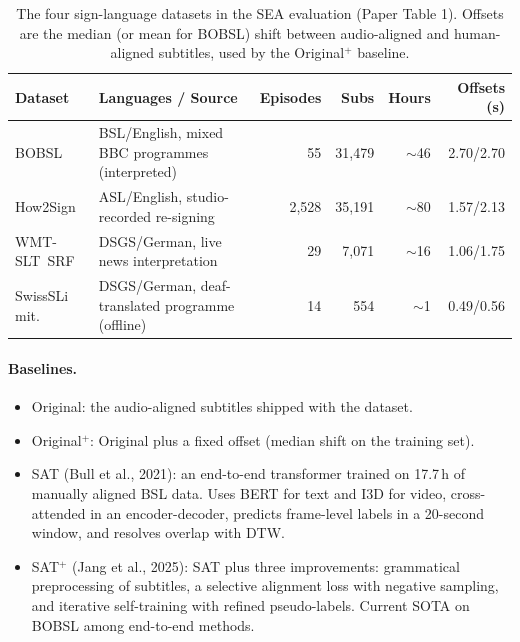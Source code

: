 \documentclass[11pt,a4paper]{article}
\def\textbf#1{#1}%
\def\emph#1{#1}%
\begin{document}
\begin{table}[h]
\centering
\small
\begin{tabularx}{\linewidth}{lXrrrr}
\toprule
\textbf{Dataset} & \textbf{Languages / Source} & \textbf{Episodes} & \textbf{Subs} & \textbf{Hours} & \textbf{Offsets (s)} \\
\midrule
BOBSL          & BSL/English, mixed BBC programmes (interpreted)       & 55    & 31{,}479 & $\sim$46  & 2.70/2.70 \\
How2Sign       & ASL/English, studio-recorded re-signing               & 2{,}528 & 35{,}191 & $\sim$80 & 1.57/2.13 \\
WMT-SLT~SRF    & DSGS/German, live news interpretation                 & 29    & 7{,}071  & $\sim$16  & 1.06/1.75 \\
SwissSLi mit.\ & DSGS/German, deaf-translated programme (offline)      & 14    & 554      & $\sim$1   & 0.49/0.56 \\
\bottomrule
\end{tabularx}
\caption{The four sign-language datasets in the SEA evaluation
(Paper Table 1). Offsets are the median (or mean for BOBSL) shift between
audio-aligned and human-aligned subtitles, used by the
\emph{Original$^{+}$} baseline.}
\label{tab:paper-datasets}
\end{table}

\paragraph{Baselines.}
\begin{itemize}[leftmargin=1.5em]
  \item \emph{Original}: the audio-aligned subtitles shipped with the dataset.
  \item \emph{Original$^{+}$}: \emph{Original} plus a fixed offset (median
        shift on the training set).
  \item \emph{SAT} (Bull et al., 2021): an end-to-end transformer trained on
        17.7\,h of manually aligned BSL data. Uses BERT for text and I3D for
        video, cross-attended in an encoder-decoder, predicts frame-level
        labels in a 20-second window, and resolves overlap with DTW.
  \item \emph{SAT$^{+}$} (Jang et al., 2025): SAT plus three improvements:
        grammatical preprocessing of subtitles, a selective alignment loss
        with negative sampling, and iterative self-training with refined
        pseudo-labels. Current SOTA on BOBSL among end-to-end methods.
\end{itemize}
\end{document}
